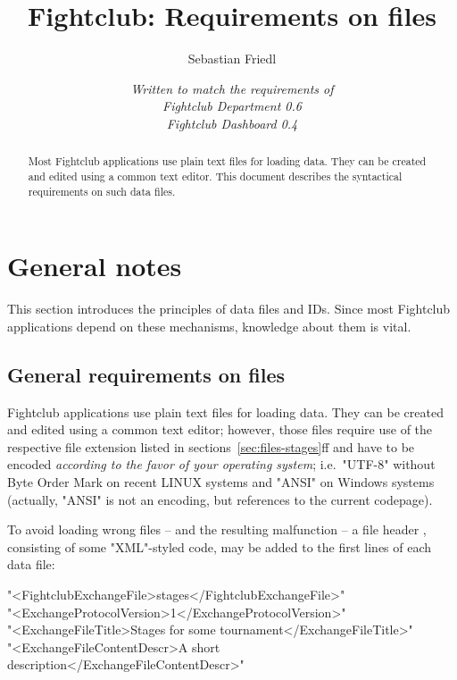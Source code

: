 \documentclass[11pt]{ltxdoc}
\title{\bfseries Fightclub: Requirements on files}
\author{Sebastian Friedl}
\date{\itshape Written to match the requirements of \\
      Fightclub Department 0.6 \\
      Fightclub Dashboard 0.4}
\def\highlight#1{%
    \colorbox{red!15}{#1}%
    \index{\textsf{#1}}}
\begin{document}
    \maketitle
    
    \begin{abstract}\noindent
        Most Fightclub applications use plain text files for loading data. They can be created and edited using a common text editor. This document describes the syntactical requirements on such data files.
    \end{abstract}

    \tableofcontents

    
    
    
    
    \clearpage
    \section{General notes}
    This section introduces the principles of data files and IDs.
    Since most Fightclub applications depend on these mechanisms, knowledge about them is vital.
    
    \subsection{General requirements on files}
    Fightclub applications use plain text files for loading data. They can be created and edited using a common text editor; however, those files require use of the respective file extension listed in sections~\ref{sec:files-stages}ff and have to be encoded \textit{according to the favor of your operating system}; i.e.~"UTF-8" without Byte Order Mark on recent LINUX systems and "ANSI" on Windows systems (actually, "ANSI" is not an encoding, but references to the current codepage).

    \medskip
    To avoid loading wrong files -- and the resulting malfunction -- a \highlight{file header}, consisting of some "XML"-styled code, may be added to the first lines of each data file:
    
    \smallskip
    "<FightclubExchangeFile>stages</FightclubExchangeFile>" \\
    "<ExchangeProtocolVersion>1</ExchangeProtocolVersion>" \\
    "<ExchangeFileTitle>Stages for some tournament</ExchangeFileTitle>" \\
    "<ExchangeFileContentDescr>A short description</ExchangeFileContentDescr>"
    
\end{document}
